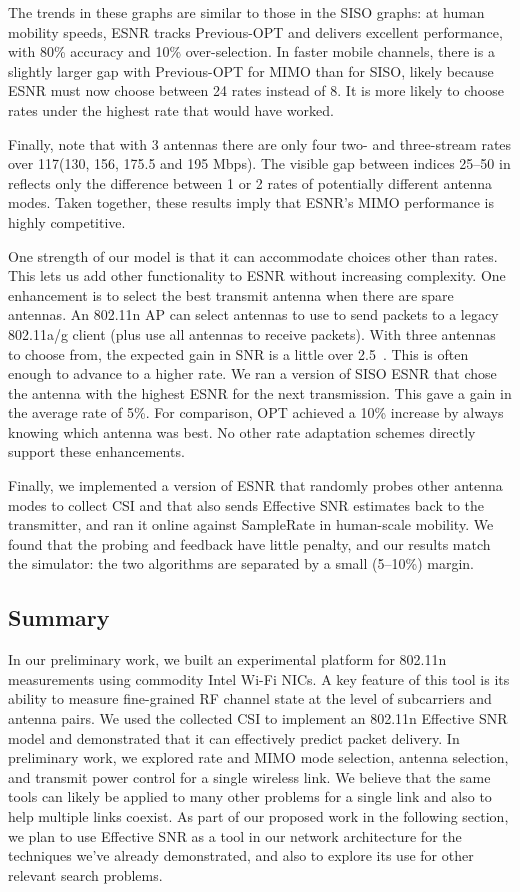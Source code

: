 The trends in these graphs are similar to those in the SISO graphs: at human mobility speeds, ESNR tracks Previous-OPT and delivers excellent performance, with 80\% accuracy and 10\% over-selection. In faster mobile channels, there is a slightly larger gap with Previous-OPT for MIMO than for SISO, likely because ESNR must now choose between 24 rates instead of 8. It is more likely to choose rates under the highest rate that would have worked. 

Finally, note that with 3 antennas there are only four two- and three-stream rates over 117\Mbps (130, 156, 175.5 and 195 Mbps). The visible gap between indices 25--50 in  reflects only the difference between 1 or 2 rates of potentially different antenna modes. Taken together, these results imply that ESNR's MIMO performance is highly competitive.

One strength of our model is that it can accommodate choices other than rates. This lets us add other functionality to ESNR without increasing complexity. One enhancement is to select the best transmit antenna when there are spare antennas.
An 802.11n AP can select antennas to use to send packets to a legacy 802.11a/g client (plus use all antennas to receive packets). With three antennas to choose from, the expected gain in SNR is a little over 2.5\dB~\cite{Goldsmith}. This is often enough to advance to a higher rate. We ran a version of SISO ESNR that chose the antenna with the highest ESNR for the next transmission. This gave a gain in the average rate of 5\%.  For comparison, OPT achieved a 10\% increase by always knowing which antenna was best. No other rate adaptation schemes directly support these enhancements.

 Finally, we implemented a version of ESNR that randomly probes other antenna modes to collect CSI and that also sends Effective SNR estimates back to the transmitter, and ran it online against SampleRate in human-scale mobility. We found that the probing and feedback have little penalty, and our results match the simulator: the two algorithms are separated by a small (5--10\%) margin.

\subsection{Summary} In our preliminary work, we built an experimental platform for 802.11n measurements using commodity Intel Wi-Fi NICs. A key feature of this tool is its ability to measure fine-grained RF channel state at the level of subcarriers and antenna pairs. We used the collected CSI to implement an 802.11n Effective SNR model and demonstrated that it can effectively predict packet delivery. In preliminary work, we explored rate and MIMO mode selection, antenna selection, and transmit power control for a single wireless link. We believe that the same tools can likely be applied to many other problems for a single link and also to help multiple links coexist. As part of our proposed work in the following section, we plan to use Effective SNR as a tool in our network architecture for the techniques we've already demonstrated, and also to explore its use for other relevant search problems.